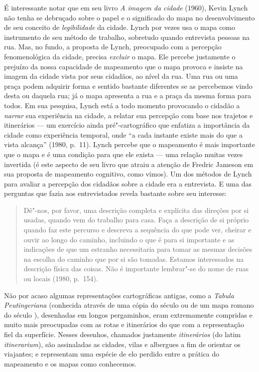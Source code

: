 É interessante notar que em seu livro \emph{A imagem da cidade} (1960),
Kevin Lynch não tenha se debruçado sobre o papel e o significado do mapa
no desenvolvimento de seu conceito de \emph{legibilidade} da cidade.
Lynch por vezes usa o mapa como instrumento de seu método de trabalho,
sobretudo quando entrevista pessoas na rua. Mas, no fundo, a proposta de
Lynch, preocupado com a percepção fenomenológica da cidade, precisa
\emph{excluir} o mapa. Ele percebe justamente o prejuízo da nossa
capacidade de mapeamento que o mapa provoca e insiste na imagem da
cidade vista por seus cidadãos, ao nível da rua. Uma rua ou uma praça
podem adquirir forma e sentido bastante diferentes se as percebemos
vindo desta ou daquela rua; já o mapa apresenta a rua e a praça da mesma
forma para todos. Em sua pesquisa, Lynch está a todo momento provocando
o cidadão a \emph{narrar} sua experiência na cidade, a relatar sua
percepção com base nos trajetos e itinerários --- um exercício ainda
pré"-cartográfico que enfatiza a importância da cidade como experiência
temporal, onde ``a cada instante existe mais do que a vista alcança''
(1980, p.~11). Lynch percebe que o mapeamento é mais importante que o
mapa e é uma condição para que ele exista --- uma relação muitas vezes
invertida (é este aspecto de seu livro que atraiu a atenção de Fredric
Jameson em sua proposta de mapeamento cognitivo, como vimos). Um dos
métodos de Lynch para avaliar a percepção dos cidadãos sobre a cidade
era a entrevista. E uma das perguntas que fazia aos entrevistados revela
bastante sobre seu interesse:

\begin{quote}
Dê"-nos, por favor, uma descrição completa e explícita das direções por
si usadas, quando vem do trabalho para casa. Faça a descrição de si
próprio quando faz este percurso e descreva a sequência do que pode ver,
cheirar e ouvir ao longo do caminho, incluindo o que é para si
importante e as indicações de que um estranho necessitaria para tomar as
mesmas decisões na escolha do caminho que por si são tomadas. Estamos
interessados na descrição física das coisas. Não é importante lembrar"-se
do nome de ruas ou locais (1980, p.~154).
\end{quote}

Não por acaso algumas representações cartográficas antigas, como a
\emph{Tabula Peutingeriana} (conhecida através de uma cópia do século
 ou  de um mapa romano do século ), desenhadas em longos
pergaminhos, eram extremamente compridas e muito mais preocupadas com as
rotas e itinerários do que com a representação fiel da superfície.
Nesses desenhos, chamados justamente \emph{itinerários} (do
latim \emph{itinerarium}), são assinaladas as cidades, vilas e albergues
a fim de orientar os viajantes; e representam uma espécie de elo perdido
entre a prática do mapeamento e os mapas como conhecemos.

